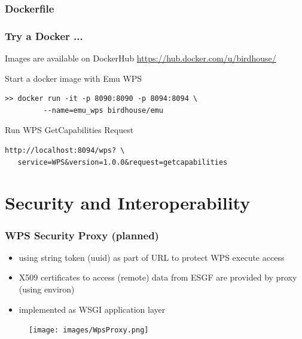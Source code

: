 \documentclass{beamer}
\begin{document}

  \begin{frame}
    \frametitle{Dockerfile}
    
\end{frame}


  \begin{frame}
    \frametitle{Try a Docker ...}
    \begin{block}{Images are available on DockerHub}
      \url{https://hub.docker.com/u/birdhouse/}
    \end{block}
    \begin{block}{Start a docker image with Emu WPS}
      \begin{verbatim}
>> docker run -it -p 8090:8090 -p 8094:8094 \
         --name=emu_wps birdhouse/emu  
      \end{verbatim}
    \end{block}
    \begin{block}{Run WPS GetCapabilities Request}
      \begin{verbatim}
http://localhost:8094/wps? \
   service=WPS&version=1.0.0&request=getcapabilities
      \end{verbatim}
    \end{block}
\end{frame}


  \section{Security and Interoperability}


  \begin{frame}
    \frametitle{WPS Security Proxy (planned)}
    \begin{itemize}
      \item using string token (uuid) as part of URL to protect WPS execute access
      \item X509 certificates to access (remote) data from ESGF are provided by proxy (using environ)
      \item implemented as WSGI application layer
    \end{itemize}
    \begin{figure}
      \texttt{[image: images/WpsProxy.png]}
    \end{figure}
  \end{frame}
\end{document}
